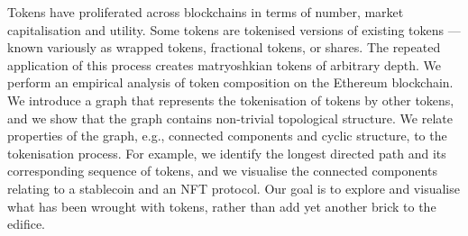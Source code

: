 Tokens have proliferated across blockchains in terms of number, market
capitalisation and utility.  Some tokens are tokenised versions of
existing tokens --- known variously as wrapped tokens, fractional
tokens, or shares.  The repeated application of this process creates
matryoshkian tokens of arbitrary depth.  We perform an empirical
analysis of token composition on the Ethereum blockchain.  We
introduce a graph that represents the tokenisation of tokens by other
tokens, and we show that the graph contains non-trivial topological
structure.  We relate properties of the graph, e.g., connected
components and cyclic structure, to the tokenisation process.  For
example, we identify the longest directed path and its corresponding
sequence of tokens, and we visualise the connected components relating
to a stablecoin and an NFT protocol.  Our goal is to explore and
visualise what has been wrought with tokens, rather than add yet
another brick to the edifice.
